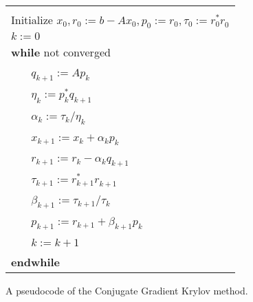 \begin{figure}
\begin{center}
\begin{tabular}{|l|}
\hline
\\Initialize $x_0, r_0 := b-Ax_0, p_0 := r_0, \tau_0 := r_{0}^* r_{0}^{}$
\\ $k := 0$                                                
\\ {\bf while} not converged
\\ ~~~ $q_{k+1}:=Ap_{k}$                        
\\ ~~~ $\eta_k:=p_{k}^*q_{k+1}^{}$    
\\ ~~~ $\alpha_k:=\tau_k/\eta_k$    
\\ ~~~ $x_{k+1}:=x_k+\alpha_k p_{k}$           
\\ ~~~ $r_{k+1}:=r_k-\alpha_k q_{k+1}$            
\\ ~~~ $\tau_{k+1}:= r_{k+1}^* r_{k+1}^{}$  
\\ ~~~ $\beta_{k+1}:=\tau_{k+1}/\tau_{k}$  
\\ ~~~ $p_{k+1}:= r_{k+1} + \beta_{k+1} p_k$ 

\\ ~~~ $k:=k+1$   
\\ {\bf endwhile}  
\\\hline
\end{tabular}
\end{center}
\caption{A pseudocode of the Conjugate Gradient Krylov method.}
\label{introduction:fig:cg}
\end{figure}

